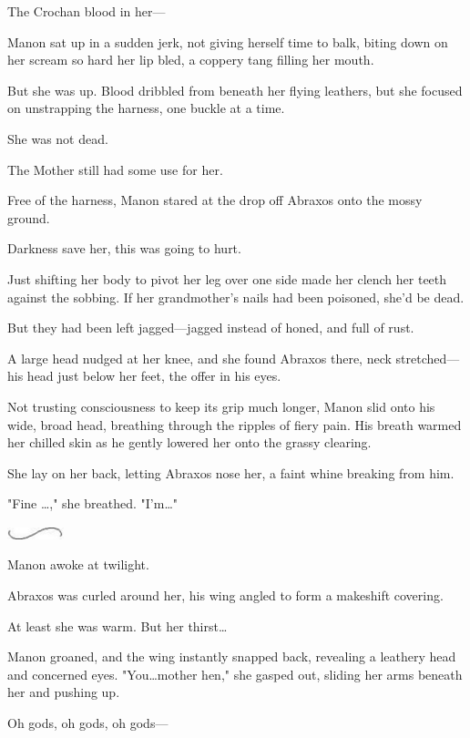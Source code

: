 The Crochan blood in her---

Manon sat up in a sudden jerk, not giving herself time to balk, biting down on her scream so hard her lip bled, a coppery tang filling her mouth.

But she was up.
Blood dribbled from beneath her flying leathers, but she focused on unstrapping the harness, one buckle at a time.

She was not dead.

The Mother still had some use for her.

Free of the harness, Manon stared at the drop off Abraxos onto the mossy ground.

Darkness save her, this was going to hurt.

Just shifting her body to pivot her leg over one side made her clench her teeth against the sobbing.
If her grandmother's nails had been poisoned, she'd be dead.

But they had been left jagged---jagged instead of honed, and full of rust.

A large head nudged at her knee, and she found Abraxos there, neck stretched---his head just below her feet, the offer in his eyes.

Not trusting consciousness to keep its grip much longer, Manon slid onto his wide, broad head, breathing through the ripples of fiery pain.
His breath warmed her chilled skin as he gently lowered her onto the grassy clearing.

She lay on her back, letting Abraxos nose her, a faint whine breaking from him.

"Fine \ldots," she breathed.
"I'm\ldots"

\begin{center}
	\includegraphics[width=0.65in,height=0.13in]{images/seperator}
\end{center}

Manon awoke at twilight.

Abraxos was curled around her, his wing angled to form a makeshift covering.

At least she was warm.
But her thirst\ldots{}

Manon groaned, and the wing instantly snapped back, revealing a leathery head and concerned eyes.
"You\ldots mother hen," she gasped out, sliding her arms beneath her and pushing up.

Oh gods, oh gods, oh gods---


